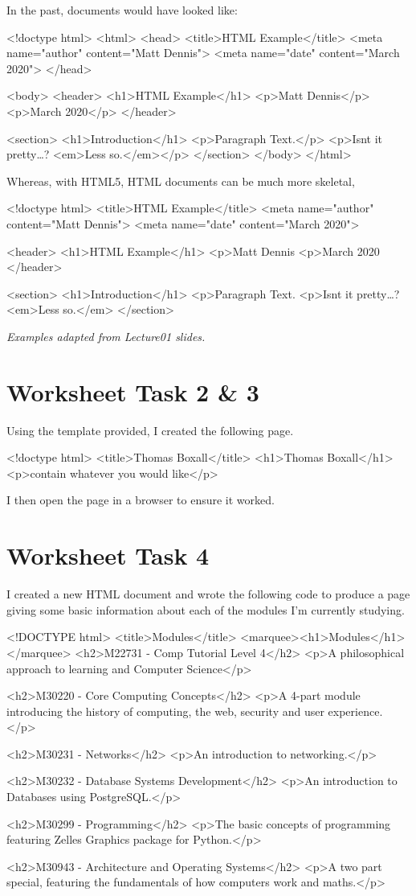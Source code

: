 In the past, documents would have looked like:
\begin{html}
<!doctype html>
<html>
  <head>
    <title>HTML Example</title>
    <meta name="author" content="Matt Dennis">
    <meta name="date"   content="March 2020">
  </head>

  <body>
    <header>
      <h1>HTML Example</h1>
      <p>Matt Dennis</p>
      <p>March 2020</p>
    </header>

    <section>
      <h1>Introduction</h1>
      <p>Paragraph Text.</p>
      <p>Isnt it pretty…? <em>Less so.</em></p>
    </section>
  </body>
</html>
\end{html}
Whereas, with HTML5, HTML documents can be much more skeletal,
\begin{html}
<!doctype html>
<title>HTML Example</title>
<meta name="author" content="Matt Dennis">
<meta name="date"   content="March 2020">

<header>
  <h1>HTML Example</h1>
  <p>Matt Dennis
  <p>March 2020
</header>

<section>
  <h1>Introduction</h1>
  <p>Paragraph Text.
  <p>Isnt it pretty…?     
    <em>Less so.</em>
</section>
\end{html}
\textit{Examples adapted from Lecture01 slides.}

\section{Worksheet Task 2 \& 3}
Using the template provided, I created the following page.
\begin{html}
<!doctype html>
<title>Thomas Boxall</title>
<h1>Thomas Boxall</h1>
<p>contain whatever you would like</p>
\end{html}
I then open the page in a browser to ensure it worked.

\section{Worksheet Task 4}
I created a new HTML document and wrote the following code to produce a page giving some basic information about each of the modules I'm currently studying.
\begin{html}
<!DOCTYPE html>
<title>Modules</title>
<marquee><h1>Modules</h1></marquee>
<h2>M22731 - Comp Tutorial Level 4</h2>
<p>A philosophical approach to learning and Computer Science</p>

<h2>M30220 - Core Computing Concepts</h2>
<p>A 4-part module introducing the history of computing, the web, security and user experience.</p>

<h2>M30231 - Networks</h2>
<p>An introduction to networking.</p>

<h2>M30232 - Database Systems Development</h2>
<p>An introduction to Databases using PostgreSQL.</p>

<h2>M30299 - Programming</h2>
<p>The basic concepts of programming featuring Zelles Graphics package for Python.</p>

<h2>M30943 - Architecture and Operating Systems</h2>
<p>A two part special, featuring the fundamentals of how computers work and maths.</p>
\end{html}
